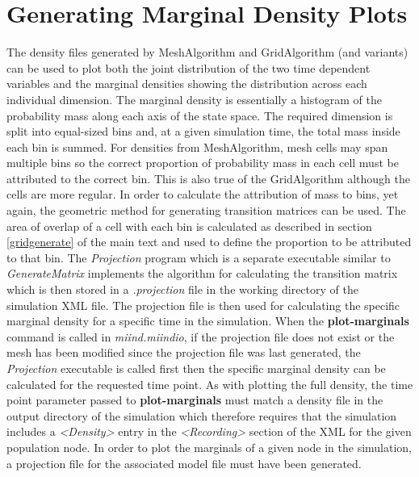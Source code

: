\documentclass[utf8]{frontiers_suppmat} %
\begin{document}
\section{Generating Marginal Density Plots}
\label{marginalsdensities}
The density files generated by MeshAlgorithm and GridAlgorithm (and variants) can be used to plot both the joint distribution of the two time dependent variables and the marginal densities showing the distribution across each individual dimension. The marginal density is essentially a histogram of the probability mass along each axis of the state space. The required dimension is split into equal-sized bins and, at a given simulation time, the total mass inside each bin is summed. For densities from MeshAlgorithm, mesh cells may span multiple bins so the correct proportion of probability mass in each cell must be attributed to the correct bin. This is also true of the GridAlgorithm although the cells are more regular. In order to calculate the attribution of mass to bins, yet again, the geometric method for generating transition matrices can be used. The area of overlap of a cell with each bin is calculated as described in section \ref{gridgenerate} of the main text and used to define the proportion to be attributed to that bin. The \textit{Projection} program which is a separate executable similar to \textit{GenerateMatrix} implements the algorithm for calculating the transition matrix which is then stored in a \textit{.projection} file in the working directory of the simulation XML file. The projection file is then used for calculating the specific marginal density for a specific time in the simulation. When the \textbf{plot-marginals} command is called in \textit{miind.miindio}, if the projection file does not exist or the mesh has been modified since the projection file was last generated, the \textit{Projection} executable is called first then the specific marginal density can be calculated for the requested time point. As with plotting the full density, the time point parameter passed to \textbf{plot-marginals} must match a density file in the output directory of the simulation which therefore requires that the simulation includes a \textit{\textless Density\textgreater} entry in the \textit{\textless Recording\textgreater} section of the XML for the given population node. In order to plot the marginals of a given node in the simulation, a projection file for the associated model file must have been generated.
\end{document}
